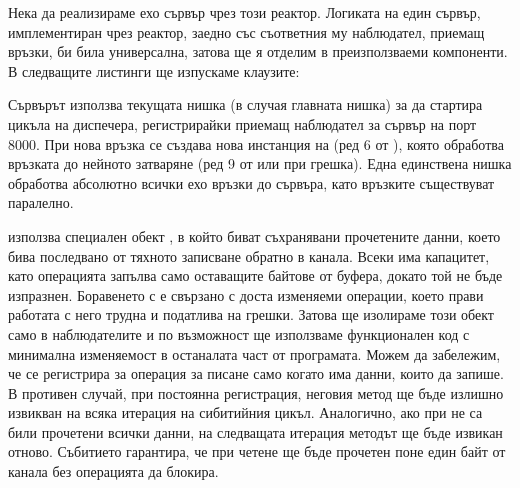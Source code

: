 Нека да реализираме ехо сървър чрез този реактор. Логиката на един сървър, имплементиран чрез реактор, заедно със съответния му наблюдател, приемащ връзки, би била универсална, затова ще я отделим в преизползваеми компоненти. В следващите листинги ще изпускаме  клаузите:









Сървърът използва текущата нишка (в случая главната нишка) за да стартира цикъла на диспечера, регистрирайки приемащ наблюдател за сървър на порт 8000. При нова връзка се създава нова инстанция на  (ред 6 от ), която обработва връзката до нейното затваряне (ред 9 от  или при грешка). Една единствена нишка обработва абсолютно всички ехо връзки до сървъра, като връзките съществуват паралелно.

 използва специален обект , в който биват съхранявани прочетените данни, което бива последвано от тяхното записване обратно в канала. Всеки  има капацитет, като  операцията запълва само оставащите байтове от буфера, докато той не бъде изпразнен. Боравенето с  е свързано с доста изменяеми операции, което прави работата с него трудна и податлива на грешки. Затова ще изолираме този обект само в наблюдателите и по възможност ще използваме функционален код с минимална изменяемост в останалата част от програмата. Можем да забележим, че  се регистрира за операция за писане само когато има данни, които да запише. В противен случай, при постоянна регистрация, неговия  метод ще бъде излишно извикван на всяка итерация на сибитийния цикъл. Аналогично, ако при  не са били прочетени всички данни, на следващата итерация методът ще бъде извикан отново. Събитието гарантира, че при четене ще бъде прочетен поне един байт от канала без  операцията да блокира.

